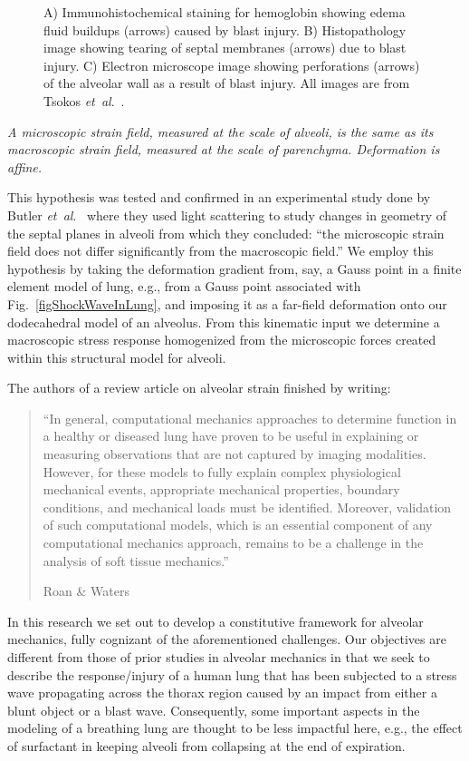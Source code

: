 \begin{figure}
{        \par}
    \caption{A) Immunohistochemical staining for hemoglobin showing edema fluid buildups (arrows) caused by blast injury. B) Histopathology image showing tearing of septal membranes (arrows) due to blast injury.  C) Electron microscope image showing perforations (arrows) of the alveolar wall as a result of blast injury.  All images are from Tsokos \textit{et~al}.\ \cite{Tsokosetal03}.}
    \label{figAlveolarDamage}
\end{figure}

\conjecture\label{conjecture}
\textit{A micro\-scopic strain field, measured at the scale of alveoli, is the same as its macro\-scopic strain field, measured at the scale of parenchyma.  Deformation is affine.}  

\medskip
This hypothesis was tested and confirmed in an experimental study done by Butler \textit{et~al}.\ \cite{Butleretal96} where they used light scattering to study changes in geometry of the septal planes in alveoli from which they concluded: ``the micro\-scopic strain field does not differ significantly from the macro\-scopic field.''  We employ this hypothesis by taking the deformation gradient from, say, a Gauss point in a finite element model of lung, e.g., from a Gauss point associated with Fig.~\ref{figShockWaveInLung}, and imposing it as a far-field deformation onto our dodecahedral model of an alveolus.  From this kinematic input we determine a macro\-scopic stress response homogenized from the micro\-scopic forces created within this structural model for alveoli.

The authors of a review article on alveolar strain finished by writing:
\begin{quotation}
    \noindent\small ``In general, computational mechanics approaches to determine function in a healthy or diseased lung have proven to be useful in explaining or measuring observations that are not captured by imaging modalities. However, for these models to fully explain complex physiological mechanical events, appropriate mechanical properties, boundary conditions, and mechanical loads must be identified. Moreover, validation of such computational models, which is an essential component of any computational mechanics approach, remains to be a challenge in the analysis of soft tissue mechanics.''
    
    \nopagebreak
    \mbox{} \hfill Roan \& Waters \cite[pg.~L633]{RoanWaters11} \normalsize
\end{quotation}
In this research we set out to develop a constitutive framework for alveolar mechanics, fully cognizant of the aforementioned challenges.  Our objectives are different from those of prior studies in alveolar mechanics in that we seek to describe the response\slash injury of a human lung that has been subjected to a stress wave propagating across the thorax region caused by an impact from either a blunt object or a blast wave.  Consequently, some important aspects in the modeling of a breathing lung are thought to be less impactful here, e.g., the effect of surfactant in keeping alveoli from collapsing at the end of expiration.

